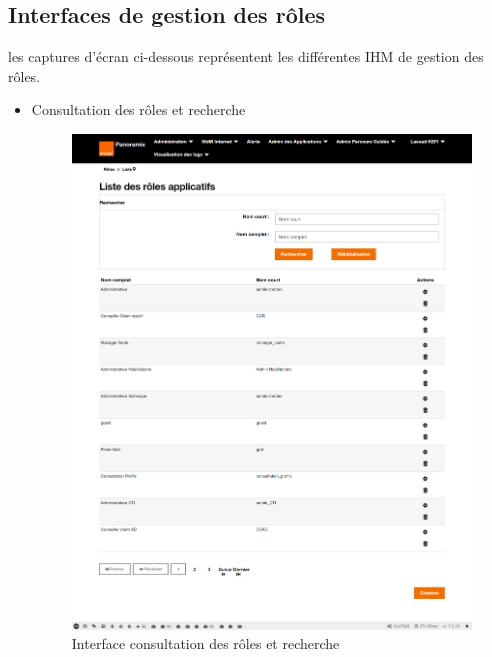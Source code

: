 \subsection{Interfaces de gestion des rôles}
les captures d'écran ci-dessous représentent les différentes IHM de gestion des rôles.
\begin{itemize}
	\item Consultation des rôles et recherche
	\begin{figure}[H]
		\centering
		\includegraphics[width=0.65\linewidth]{img/screenshots/roles/index}
		\caption[Interface consultation des rôles]{Interface consultation des rôles et recherche}
		\label{fig:index-roles}
	\end{figure}
	

\end{itemize}

